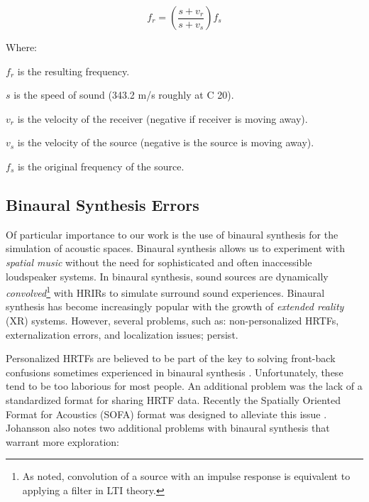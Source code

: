 \begin{equation}
f_{r}=\left(\frac{s+v_{r}}{s+v_{s}}\right) f_{s}
\label{eq:doppler}
\end{equation}

Where: 
\begin{description}
    \item $f_r$ is the resulting frequency.
    \item $s$ is the speed of sound (343.2 m/s roughly at C 20\textdegree).
    \item $v_r$ is the velocity of the receiver (negative if receiver is moving away). 
    \item $v_s$ is the velocity of the source (negative is the source is moving away).
    \item $f_s$ is the original frequency of the source.
\end{description}
    
\subsection{Binaural Synthesis Errors}

Of particular importance to our work is the use of binaural synthesis for the simulation of acoustic spaces. Binaural synthesis allows us to experiment with \textit{spatial music} without the need for sophisticated and often inaccessible loudspeaker systems. In binaural synthesis, sound sources are dynamically \textit{convolved}\footnote{As noted, convolution of a source with an impulse response is equivalent to applying a filter in LTI theory.} with HRIRs to simulate surround sound experiences. Binaural synthesis has become increasingly popular with the growth of \textit{extended reality} (XR) systems. However, several problems, such as: non-personalized HRTFs, externalization errors, and localization issues; persist. 


Personalized HRTFs are believed to be part of the key to solving front-back confusions sometimes experienced in binaural synthesis \cite{johansson2019vr}. Unfortunately, these tend to be too laborious for most people. An additional problem was the lack of a standardized format for sharing HRTF data. Recently the Spatially Oriented Format for Acoustics (SOFA) format was designed to alleviate this issue \cite{majdak2013spatially}. Johansson \cite{johansson2019vr} also notes two additional problems with binaural synthesis that warrant more exploration:

